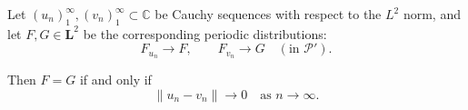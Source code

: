 Let $(u_n)_{1}^{\infty}, (v_n)_{1}^{\infty} \subset \mathbb{C}$ be Cauchy sequences with respect to the $L^2$ norm, and let $F, G \in \mathbf{L}^2$ be the corresponding periodic distributions:
$$
F_{u_n} \to F, \qquad F_{v_n} \to G \quad (\text{in } \mathcal{P}').
$$

Then $F = G$ if and only if
$$
\|u_n - v_n\| \to 0 \quad \text{as } n \to \infty.
$$
